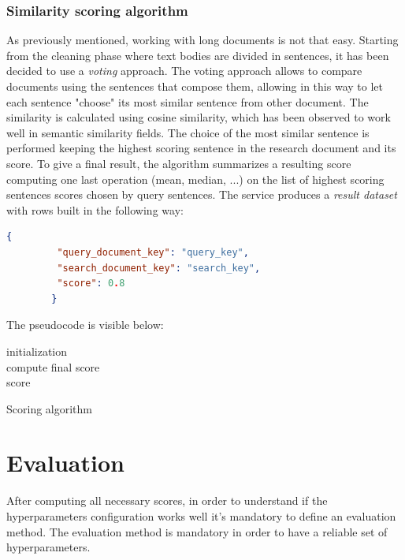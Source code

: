 \documentclass[\main/main.tex]{subfiles}
\begin{document}
\subsubsection{Similarity scoring algorithm}
As previously mentioned, working with long documents is not that easy. Starting from the cleaning phase where text bodies are divided in sentences, it has been decided to use a \emph{voting} approach. The voting approach allows to compare documents using the sentences that compose them, allowing in this way to let each sentence "choose" its most similar sentence from other document. The similarity is calculated using cosine similarity, which has been observed to work well in semantic similarity fields. The choice of the most similar sentence is performed keeping the highest scoring sentence in the research document and its score. To give a final result, the algorithm summarizes a resulting score computing one last operation (mean, median, ...) on the list of highest scoring sentences scores chosen by query sentences. The service produces a \emph{result dataset} with rows built in the following way:
\\
\begin{center}
    \begin{lstlisting}[language=json, caption="Parameter message example", captionpos=b]
        {
         "query_document_key": "query_key",
         "search_document_key": "search_key",
         "score": 0.8
        }
    \end{lstlisting}
\end{center}
The pseudocode is visible below:
\begin{center}
    \begin{algorithm}[H]
     initialization\\
     compute final score\\
     \Return score
     \caption{Scoring algorithm}
    \end{algorithm}
\end{center}

\section{Evaluation}
After computing all necessary scores, in order to understand if the hyperparameters configuration works well it's mandatory to define an evaluation method. The evaluation method is mandatory in order to have a reliable set of hyperparameters. \\
\end{document}
